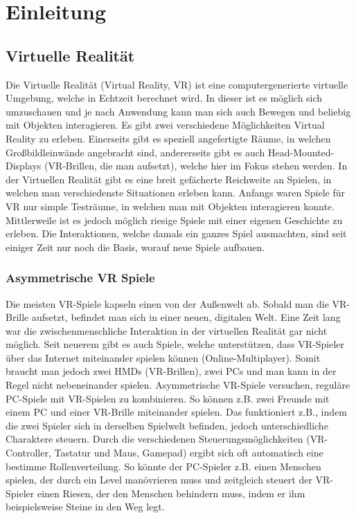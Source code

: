 \chapter{Einleitung}
\label{cha:sa_Einleitung}

\section{Virtuelle Realität}
Die Virtuelle Realität (Virtual Reality, VR) ist eine computergenerierte virtuelle Umgebung, welche in Echtzeit berechnet wird. In dieser ist es möglich sich umzuschauen und je nach Anwendung kann man sich auch Bewegen und beliebig mit Objekten interagieren. Es gibt zwei verschiedene Möglichkeiten Virtual Reality zu erleben. Einerseits gibt es speziell angefertigte Räume, in welchen Großbildleinwände angebracht sind, andererseits gibt es auch Head-Mounted-Displays (VR-Brillen, die man aufsetzt), welche hier im Fokus stehen werden. In der Virtuellen Realität gibt es eine breit gefächerte Reichweite an Spielen, in welchen man verschiedenste Situationen erleben kann. Anfangs waren Spiele für VR nur simple Testräume, in welchen man mit Objekten interagieren konnte. Mittlerweile ist es jedoch möglich riesige Spiele mit einer eigenen Geschichte zu erleben. Die Interaktionen, welche damals ein ganzes Spiel ausmachten, sind seit einiger Zeit nur noch die Basis, worauf neue Spiele aufbauen.

\subsection{Asymmetrische VR Spiele}
Die meisten VR-Spiele kapseln einen von der Außenwelt ab. Sobald man die VR-Brille aufsetzt, befindet man sich in einer neuen, digitalen Welt. Eine Zeit lang war die zwischenmenschliche Interaktion in der virtuellen Realität gar nicht möglich. Seit neuerem gibt es auch Spiele, welche unterstützen, dass VR-Spieler über das Internet miteinander spielen können (Online-Multiplayer). Somit braucht man jedoch zwei HMDs (VR-Brillen), zwei PCs und man kann in der Regel nicht nebeneinander spielen. Asymmetrische VR-Spiele versuchen, reguläre PC-Spiele mit VR-Spielen zu kombinieren. So können z.B. zwei Freunde mit einem PC und einer VR-Brille miteinander spielen. Das funktioniert z.B., indem die zwei Spieler sich in derselben Spielwelt befinden, jedoch unterschiedliche Charaktere steuern. Durch die verschiedenen Steuerungsmöglichkeiten (VR-Controller, Tastatur und Maus, Gamepad) ergibt sich oft automatisch eine bestimme Rollenverteilung. So könnte der PC-Spieler z.B. einen Menschen spielen, der durch ein Level manövrieren muss und zeitgleich steuert der VR-Spieler einen Riesen, der den Menschen behindern muss, indem er ihm beispielsweise Steine in den Weg legt.

